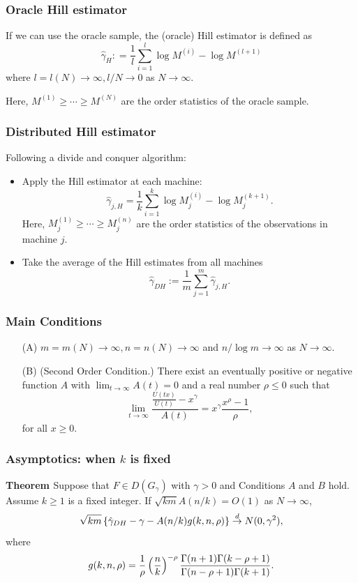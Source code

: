 \documentclass{beamer}
\begin{document}
\begin{frame}
    \frametitle{Oracle Hill estimator}
    If we can use the oracle sample, the (oracle) Hill estimator is defined as
    $$
        \hat{\gamma}_H: = \frac{1}{l}\sum_{i=1}^{l} \log M^{(i)}-\log M^{(l+1)}
    $$
    where $l = l(N)\to \infty, l/N \to 0$ as $N\to \infty$.
   
    Here, $M^{(1)} \ge \cdots \ge  M^{(N)}$ are the order statistics of the oracle sample.

\end{frame}

\begin{frame}
    \frametitle{Distributed Hill estimator}
Following a divide and conquer algorithm:

\medskip
\begin{itemize}
    \item Apply the Hill estimator at each machine:
    $$
        \hat{\gamma}_{j,H} = \frac{1}{k}\sum_{i=1}^{k} \log M_{j}^{(i)} -\log M_j^{(k+1)}.
    $$
    Here, $M^{(1)}_j \ge \cdots \ge M_j^{(n)}$ are the order statistics of the observations in machine $j$.
    \medskip
    \item Take the average of the Hill estimates from all machines
    $$
    \hat{\gamma}_{DH}:=\frac{1}{m}\sum_{j=1}^m \hat{\gamma}_{j,H}.
    $$
\end{itemize}
    
\end{frame}


\begin{frame}

    \frametitle{Main Conditions}

\begin{itemize}
    \item[(A)] $m = m(N)\to\infty, n= n(N)\to\infty$ and $n/\log m\to\infty$ as $N\to\infty$. 
    \bigskip
    \item[(B)] (Second Order Condition.)  There exist an eventually positive or negative function $A$ with $\lim_{t\to\infty} A(t)=0$ and a real number $\rho\le 0$ such that
    $$
    \lim_{t\to\infty} \frac{\frac{U(tx)}{U(t)}-x^{\gamma}}{A(t)} = x^{\gamma}\frac{x^{\rho}-1}{\rho},
    $$
    for all $x\ge 0$.
\end{itemize}
    

\end{frame}

\begin{frame}
    \frametitle{Asymptotics: when $k$ is fixed}
{\bf{Theorem }}
    Suppose that $F\in D(G_{\gamma})$ with $\gamma>0$ and Conditions $A$ and $B$ hold. Assume $k\ge 1$ is a fixed integer. If $\sqrt{km}A(n/k) = O(1)$ as $N\to\infty$,
    $$
\sqrt{km}\left\{\hat{\gamma}_{DH}-\gamma-A(n/k)g(k,n,\rho)\right\}\stackrel{d}{\to} N(0,\gamma^2),
    $$
where
$$
g(k,n,\rho) = \frac{1}{\rho}\left(\frac{n}{k}\right)^{-\rho} \frac{\Gamma(n+1)\Gamma(k-\rho+1)}{\Gamma(n-\rho+1)\Gamma(k+1)}.
$$
\end{frame}
\end{document}
